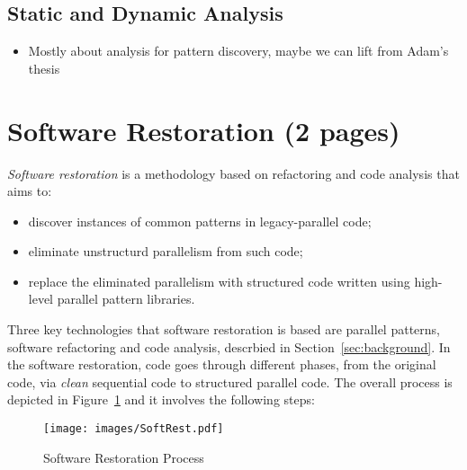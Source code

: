 \documentclass[runningheads]{llncs}
\begin{document}
\subsection{Static and Dynamic Analysis}
\begin{itemize}
\item Mostly about analysis for pattern discovery, maybe we can lift from Adam's thesis
\end{itemize}


\section{Software Restoration (2 pages)} \label{sec:softRest}

\noindent
\emph{Software restoration} is a methodology based on refactoring and code analysis that aims to:
\begin{itemize}
\item discover instances of common patterns in legacy-parallel code;
\item eliminate unstructurd parallelism from such code;
  \item replace the eliminated parallelism with structured code written using high-level parallel pattern libraries.
\end{itemize}
Three key technologies that software restoration is based are parallel patterns, software refactoring and code analysis, descrbied in Section~\ref{sec:background}. In the software restoration, code goes through different phases, from the original code, via \emph{clean} sequential code to structured parallel code. The overall process is depicted in Figure~\ref{fig:SoftRest} and it involves the following steps: 

\begin{figure}
\centering
\texttt{[image: images/SoftRest.pdf]}
\vspace{-2cm}
\caption{Software Restoration Process}
\label{fig:SoftRest}
\end {figure}
\end{document}
